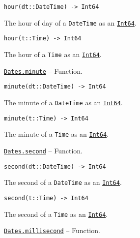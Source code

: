 \begin{adjustwidth}{2em}{0pt}


\begin{verbatim}
hour(dt::DateTime) -> Int64
\end{verbatim}

The hour of day of a \texttt{DateTime} as an \hyperlink{7720564657383125058}{\texttt{Int64}}.




\begin{lstlisting}
hour(t::Time) -> Int64
\end{lstlisting}

The hour of a \texttt{Time} as an \hyperlink{7720564657383125058}{\texttt{Int64}}.



\end{adjustwidth}
\hypertarget{1962337999361765726}{} 
\hyperlink{1962337999361765726}{\texttt{Dates.minute}}  -- {Function.}

\begin{adjustwidth}{2em}{0pt}


\begin{verbatim}
minute(dt::DateTime) -> Int64
\end{verbatim}

The minute of a \texttt{DateTime} as an \hyperlink{7720564657383125058}{\texttt{Int64}}.




\begin{lstlisting}
minute(t::Time) -> Int64
\end{lstlisting}

The minute of a \texttt{Time} as an \hyperlink{7720564657383125058}{\texttt{Int64}}.



\end{adjustwidth}
\hypertarget{15148061267327101157}{} 
\hyperlink{15148061267327101157}{\texttt{Dates.second}}  -- {Function.}

\begin{adjustwidth}{2em}{0pt}


\begin{verbatim}
second(dt::DateTime) -> Int64
\end{verbatim}

The second of a \texttt{DateTime} as an \hyperlink{7720564657383125058}{\texttt{Int64}}.




\begin{lstlisting}
second(t::Time) -> Int64
\end{lstlisting}

The second of a \texttt{Time} as an \hyperlink{7720564657383125058}{\texttt{Int64}}.



\end{adjustwidth}
\hypertarget{4812831413693375163}{} 
\hyperlink{4812831413693375163}{\texttt{Dates.millisecond}}  -- {Function.}

